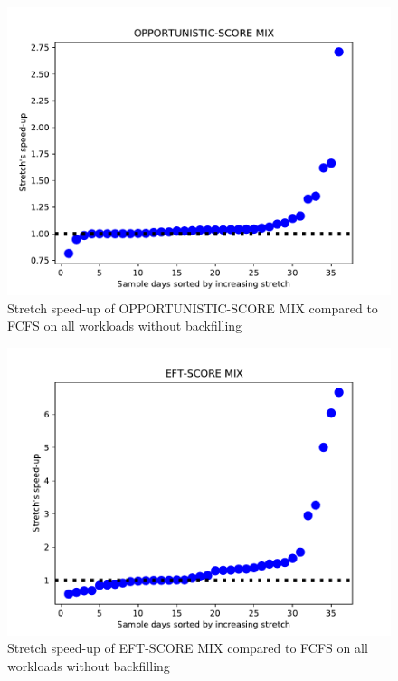 \documentclass[conference,10pt]{IEEEtran}
\begin{document}
\begin{figure}\centering\includegraphics[width=1\linewidth]{../MBSS/plot/Scatter/scatter_mean_stretch_all_workloads_OPPORTUNISTIC-SCORE-MIX.pdf}\caption{Stretch speed-up of OPPORTUNISTIC-SCORE MIX compared to FCFS on all workloads without backfilling}\end{figure}
\begin{figure}\centering\includegraphics[width=1\linewidth]{../MBSS/plot/Scatter/scatter_mean_stretch_all_workloads_EFT-SCORE-MIX.pdf}\caption{Stretch speed-up of EFT-SCORE MIX compared to FCFS on all workloads without backfilling}\end{figure}
\end{document}
